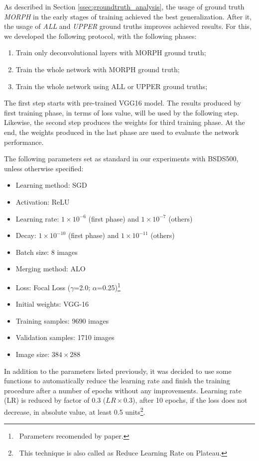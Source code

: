 As described in Section \ref{ssec:groundtruth_analysis}, the usage of ground truth \textit{MORPH} in the early stages of training achieved the best generalization.
After it, the usage of \textit{ALL} and \textit{UPPER} ground truths improves achieved results.
For this, we developed the following protocol, with the following phases:

\begin{enumerate}
    \item Train only deconvolutional layers with MORPH ground truth;
    \item Train the whole network with MORPH ground truth;
    \item Train the whole network using ALL or UPPER ground truths;
\end{enumerate}

The first step starts with pre-trained VGG16 model.
The results produced by first training phase, in terms of loss value, will be used by the following step.
Likewise, the second step produces the weights for third training phase.
At the end, the weights produced in the last phase are used to evaluate the network performance.

The following parameters set as standard in our experiments with BSDS500, unless otherwise specified:
\begin{itemize}
    \item Learning method: SGD
    \item Activation: ReLU
    \item Learning rate: $1 \times 10^{-6}$ (first phase) and $1 \times 10^{-7}$ (others)
    \item Decay: $1 \times 10^{-10}$ (first phase) and $1 \times 10^{-11}$ (others)
    \item Batch size: 8 images
    \item Merging method: ALO
    \item Loss: Focal Loss ($\gamma$=2.0; $\alpha$=0.25)\footnote{~Parameters recomended by \cite{Lin:2017} paper.}
    \item Initial weights: VGG-16
    \item Training samples: 9690 images 
    \item Validation samples: 1710 images
    \item Image size: $384 \times 288$
\end{itemize}

In addition to the parameters listed previously, it was decided to use some functions to automatically reduce the learning rate and finish the training procedure after a number of epochs without any improvements. 
Learning rate (LR) is reduced by factor of 0.3 ($LR \times 0.3$), after 10 epochs, if the loss does not decrease, in absolute value, at least 0.5 units\footnote{~This technique is also called as Reduce Learning Rate on Plateau.}.

